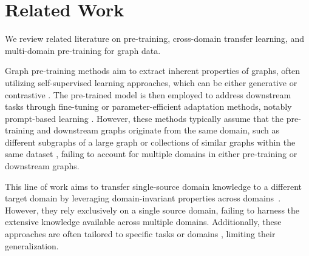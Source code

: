 \section{Related Work}
We review related literature on pre-training, cross-domain transfer learning, and multi-domain pre-training for graph data.

Graph pre-training methods aim to extract inherent properties of graphs, often utilizing self-supervised learning approaches, which can be either generative \cite{hu2020gpt,li2023s,hou2022graphmae,jiang2023incomplete} or contrastive \cite{velivckovic2018deep,xia2022simgrace,xu2021self,li2022mining}. The pre-trained model is then employed to address downstream tasks through fine-tuning \cite{you2020graph,velivckovic2018deep,qiu2020gcc} or parameter-efficient adaptation methods, notably prompt-based learning \cite{sun2022gppt,liu2023graphprompt,yu2023generalized,fang2022universal}. However, these methods typically assume that the pre-training and downstream graphs originate from the same domain, such as different subgraphs of a large graph \cite{you2020graph,yu2023hgprompt} or collections of similar graphs within the same dataset \cite{hu2020gpt,qiu2020gcc}, failing to account for multiple domains in either pre-training or downstream graphs.

This line of work aims to transfer single-source domain knowledge to a different target domain by leveraging domain-invariant properties across domains~\cite{ding2021cross,hassani2022cross,wang2021pre,wang2023cross}. However, they rely exclusively on a single source domain, failing to harness the extensive knowledge available across multiple domains. Additionally, these approaches are often tailored to specific tasks or domains \cite{ding2021cross,hassani2022cross,wang2021pre,wang2023cross}, limiting their generalization.

